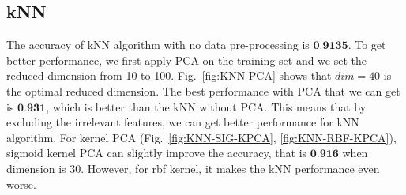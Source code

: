 \documentclass[12pt]{article}
\begin{document}
\subsection{kNN}
The accuracy of kNN algorithm with no data pre-processing is $\textbf{0.9135}$. To get better performance, we first apply PCA on the training set and we set the reduced dimension from 10 to 100. Fig.~\ref{fig:KNN-PCA} shows that $dim=40$ is the optimal reduced dimension. The best performance with PCA that we can get is $\textbf{0.931}$, which is better than the kNN without PCA. This means that by excluding the irrelevant features, we can get better performance for kNN algorithm. 
For kernel PCA (Fig.~\ref{fig:KNN-SIG-KPCA}, \ref{fig:KNN-RBF-KPCA}), sigmoid kernel PCA can slightly improve the accuracy, that is $\textbf{0.916}$ when dimension is 30. However, for rbf kernel, it makes the kNN performance even worse.
\end{document}
